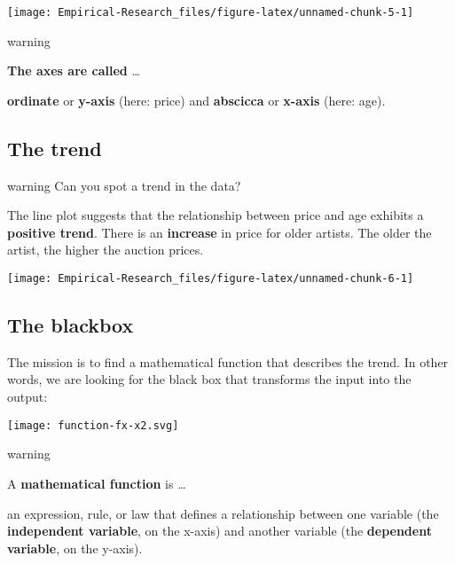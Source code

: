 \documentclass[
]{book}
\begin{document}
\begin{center}\texttt{[image: Empirical-Research\_files/figure-latex/unnamed-chunk-5-1]} \end{center}

\begin{infobox}warning

\textbf{The axes are called} \ldots{}

\textbf{ordinate} or \textbf{y-axis} (here: price) and \textbf{abscicca} or \textbf{x-axis} (here: age).

\end{infobox}

\hypertarget{the-trend}{%
\subsection{The trend}\label{the-trend}}

\begin{infobox}warning
Can you spot a trend in the data?

\end{infobox}

The line plot suggests that the relationship between price and age exhibits a \textbf{positive trend}. There is an \textbf{increase} in price for older artists. The older the artist, the higher the auction prices.

\begin{center}\texttt{[image: Empirical-Research\_files/figure-latex/unnamed-chunk-6-1]} \end{center}

\hypertarget{the-blackbox}{%
\subsection{The blackbox}\label{the-blackbox}}

The mission is to find a mathematical function that describes the trend. In other words, we are looking for the black box that transforms the input into the output:

\texttt{[image: function-fx-x2.svg]}

\begin{infobox}warning

A \textbf{mathematical function} is \ldots{}

an expression, rule, or law that defines a relationship between one variable (the \textbf{independent variable}, on the x-axis) and another variable (the \textbf{dependent variable}, on the y-axis).

\end{infobox}
\end{document}
